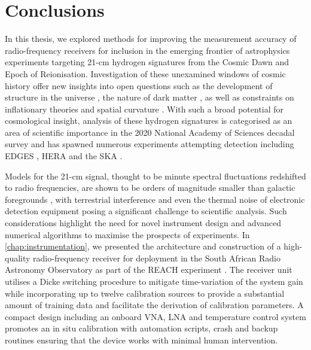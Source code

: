 \chapter{Conclusions}\label{chap:conclusions}

\ifpdf
    \graphicspath{{conclusions/figs/Raster/}{conclusions/figs/PDF/}{conclusions/figs/}}
\else
    \graphicspath{{conclusions/figs/Vector/}{conclusions/figs/}}
\fi

In this thesis, we explored methods for improving the measurement accuracy of radio-frequency receivers for inclusion in the emerging frontier of astrophysics experiments targeting 21-cm hydrogen signatures from the Cosmic Dawn and Epoch of Reionisation. Investigation of these unexamined windows of cosmic history offer new insights into open questions such as the development of structure in the universe \citep{furlanetto_ast}, the nature of dark matter \citep{21cm_dm}, as well as constraints on inflationary theories and spatial curvature \citep{21cm_inflation,21cm_curvature}. With such a broad potential for cosmological insight, analysis of these hydrogen signatures is categorised as an area of scientific importance in the 2020 National Academy of Sciences decadal survey \citep{decade_survey} and has spawned numerous experiments attempting detection including EDGES \citep{edges}, HERA \citep{hera} and the SKA \citep{ska}.

Models for the 21-cm signal, thought to be minute spectral fluctuations redshifted to radio frequencies, are shown to be orders of magnitude smaller than galactic foregrounds \citep{foregrounds}, with terrestrial interference \citep{reach} and even the thermal noise of electronic detection equipment posing a significant challenge to scientific analysis. Such considerations highlight the need for novel instrument design and advanced numerical algorithms to maximise the prospects of experiments. In \cref{chap:instrumentation}, we presented the architecture and construction of a high-quality radio-frequency receiver for deployment in the South African Radio Astronomy Observatory as part of the REACH experiment \citep{reach}. The receiver unit utilises a Dicke switching procedure to mitigate time-variation of the system gain while incorporating up to twelve calibration sources to provide a substantial amount of training data and facilitate the derivation of calibration parameters. A compact design including an onboard VNA, LNA and temperature control system promotes an in situ calibration with automation scripts, crash and backup routines ensuring that the device works with minimal human intervention.

